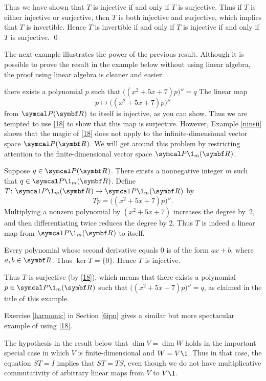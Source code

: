 Thus we have shown that $T$ is injective if and only if $T$ is surjective. Thus if $T$ is either injective or surjective, then $T$ is both injective and surjective, which implies that $T$ is invertible. Hence $T$ is invertible if and only if $T$ is injective if and only if $T$ is surjective.
\qed

The next example illustrates the power of the previous result. Although it is possible to prove the result in the example below without using linear algebra, the proof using linear algebra is cleaner and easier.

\begin{example}{\!there exists a polynomial\/ $p$ such that\/ $\bigl((x^2 + 5x + 7)p\bigr)'' = q$}
The linear map
\[
p \mapsto \bigl((x^2 + 5x + 7)p\bigr)''
\]
from $\P(\R{})$ to itself is injective, as you can show. Thus we are tempted to use \ref{18} to show that this map is surjective. However, Example \ref{ninsii} shows that the magic of \ref{18} does not apply to the infinite-dimensional vector space $\P(\R{})$. We will get around this problem by restricting attention to the finite-dimensional vector space $\P\1_m(\R{})$.

Suppose $q \in \P(\R{})$. There exists a nonnegative integer $m$ such that $q \in \P\1_m(\R{})$. Define $T \colon \P\1_m(\R{}) \to \P\1_m(\R{})$ by
\[
Tp = \bigl((x^2 + 5x + 7)p\bigr)''\!.
\]
Multiplying a nonzero polynomial by $(x^2 + 5x + 7)$ increases the degree by~$2$, and then differentiating twice reduces the degree by $2$. Thus $T$ is indeed a linear map from $\P\1_m(\R{})$ to itself.

Every polynomial whose second derivative equals $0$ is of the form $ax + b$, where $a, b \in \R{}$. Thus $\ker T = \{0\}$. Hence $T$ is injective.

Thus $T$ is surjective (by \ref{18}), which means that there exists a polynomial $p \in \P\1_m(\R{})$ such that
$\bigl((x^2 + 5x + 7)p\bigr)'' = q$, as claimed in the title of this example.
\end{example}

Exercise \ref{harmonic} in Section \ref{6ipn} gives a similar but more spectacular example of using \ref{18}.

The hypothesis in the result below that $\dim V = \dim W$ holds in the important special case in which $V$ is finite-dimensional and
$W = V\1$. Thus in that case, the equation $ST = I$ implies that $ST = TS$, even though we do not have multiplicative commutativity of arbitrary linear maps from $V$ to $V\1$.

